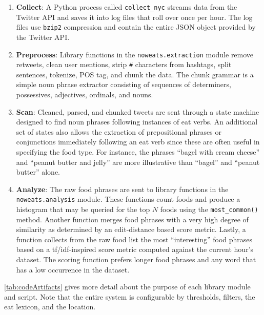 \documentclass[letterpaper]{article}%
\begin{document}
\begin{enumerate}[(1)]
  \item \textbf{Collect}: A Python process called \texttt{collect\_nyc}
    streams data from the Twitter API and saves it into log files that roll
    over once per hour. The log files use \texttt{bzip2} compression and
    contain the entire JSON object provided by the Twitter API.

  \item \textbf{Preprocess}: Library functions in the
    \texttt{noweats.extraction} module remove retweets, clean user mentions,
    strip \texttt{\#} characters from hashtags, split sentences, tokenize, POS
    tag, and chunk the data. The chunk grammar is a simple noun phrase
    extractor consisting of sequences of determiners, possessives, adjectives,
    ordinals, and nouns.

  \item \textbf{Scan}: Cleaned, parsed, and chunked tweets are sent through a
    state machine designed to find noun phrases following instances of eat
    verbs. An additional set of states also allows the extraction of
    prepositional phrases or conjunctions immediately following an eat verb
    since these are often useful in specifying the food type. For instance, the
    phrases ``bagel with cream cheese'' and ``peanut butter and jelly'' are
    more illustrative than ``bagel'' and ``peanut butter'' alone.

  \item \textbf{Analyze}: The raw food phrases are sent to library functions in
    the \texttt{noweats.analysis} module. These functions count foods and
    produce a histogram that may be queried for the top $N$ foods using the
    \texttt{most\_common()} method. Another function merges food phrases with a
    very high degree of similarity as determined by an edit-distance based
    score metric. Lastly, a function collects from the raw food list the most
    ``interesting'' food phrases based on a tf/idf-inspired score metric
    computed against the current hour's dataset. The scoring function prefers
    longer food phrases and any word that has a low occurrence in the dataset.
\end{enumerate}

\autoref{tab:codeArtifacts} gives more detail about the purpose of each library
module and script. Note that the entire system is configurable by thresholds,
filters, the eat lexicon, and the location.
\end{document}

